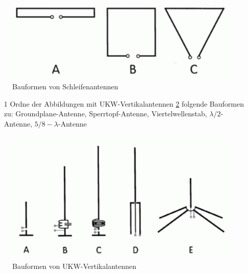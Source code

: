 \begin{figure}[H]
	\centering
	\includegraphics[scale=0.4]{Antennen/Bilder/Schleifen.pdf}
	\caption{Bauformen von Schleifenantennen}
	\label{schleifen}
\end{figure}


\begin{enumerate} 
\itemsep1pt\parskip0pt
\item[1] Ordne der Abbildungen mit UKW-Vertikalantennen \ref{ukw} folgende Bauformen zu: Groundplane-Antenne, Sperrtopf-Antenne, Viertelwellenstab, $\lambda/2$-Antenne, $5/8- \lambda$-Antenne
\end{enumerate}

\begin{figure}[H]
	\centering
	\includegraphics[scale=0.4]{Antennen/Bilder/ukw.pdf}
	\caption{Bauformen von UKW-Vertikalantennen}
	\label{ukw}
\end{figure}


